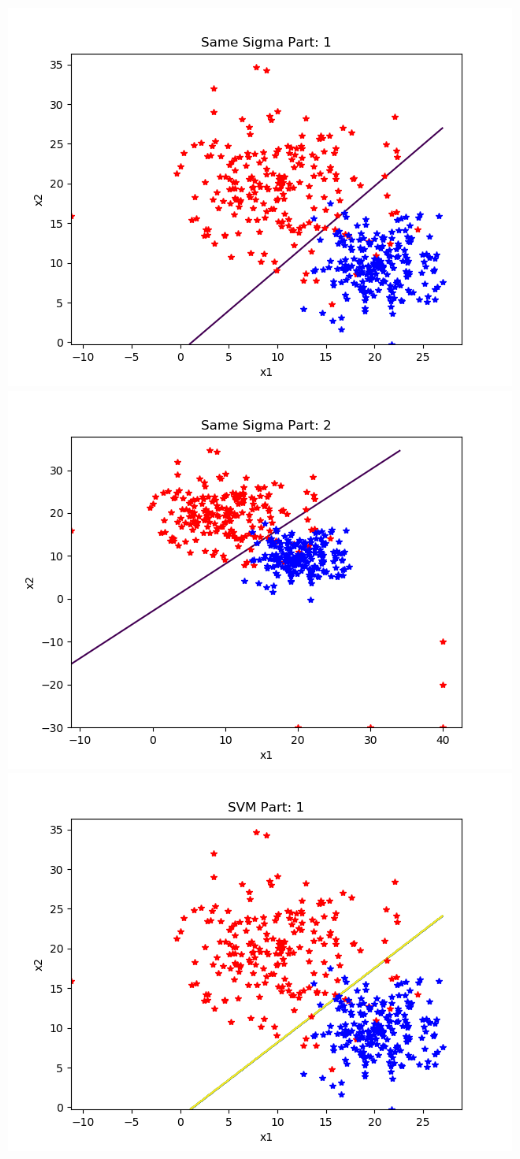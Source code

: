 \documentclass[a4paper,11pt]{article}
\begin{document}
\begin{mlsolution}
  \includegraphics{Figure_2}
  \includegraphics{Figure_22}
  \includegraphics{Figure_svm1}

\end{mlsolution}
\end{document}
